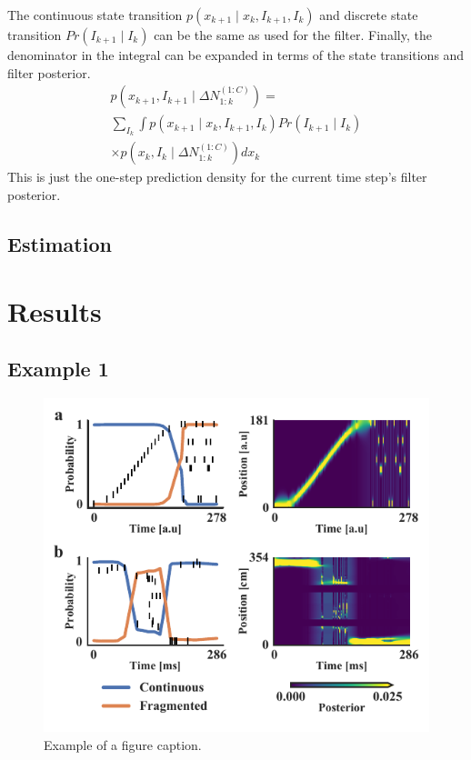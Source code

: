 \documentclass[conference]{IEEEtran}
\begin{document}
The continuous state transition $p(x_{k+1} \mid x_{k}, I_{k+1}, I_{k})$ and discrete state transition $Pr(I_{k+1} \mid I_{k})$ can be the same as used for the filter. Finally, the denominator in the integral can be expanded in terms of the state transitions and filter posterior.
\begin{multline}
p(x_{k+1}, I_{k+1} \mid \Delta N_{1:k}^{(1:C)}) = \\
\sum_{I_{k}} \int p(x_{k+1} \mid x_{k}, I_{k+1}, I_{k}) Pr(I_{k+1} \mid I_{k}) \\
\times p(x_{k}, I_{k} \mid \Delta N_{1:k}^{(1:C)}) dx_{k}
\end{multline}
This is just the one-step prediction density for the current time step's filter posterior.

\subsection{Estimation}
\section{Results}
\subsection{Example 1}
\begin{figure}[ht]
\centerline{\includegraphics{fig1.pdf}}
\caption{Example of a figure caption.}
\label{fig}
\end{figure}
\end{document}
